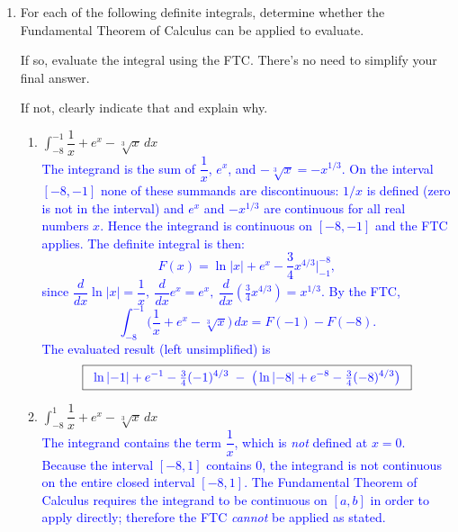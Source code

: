 \documentclass[11pt]{article}
\begin{document}
\begin{enumerate}

\newpage

%
\item For each of the following definite integrals, determine whether the Fundamental Theorem of Calculus can be applied to evaluate. 

If so, evaluate the integral using the FTC. There's no need to simplify your final answer.

If not, clearly indicate that and explain why.

\begin{enumerate}
    \item $\displaystyle\int_{-8}^{-1}\dfrac{1}{x}+e^x-\sqrt[3]{x}\, dx$\\
\textcolor{blue}{
The integrand is the sum of $\dfrac{1}{x}$, $e^x$, and $-\sqrt[3]{x}=-x^{1/3}$.  On the interval $[-8,-1]$ none of these summands are discontinuous: $1/x$ is defined (zero is not in the interval) and $e^x$ and $-x^{1/3}$ are continuous for all real numbers $x$.  Hence the integrand is continuous on $[-8,-1]$ and the FTC applies.
    The definite integral is then:\\
    \[
    F(x)=\ln|x|+e^x-\frac{3}{4}x^{4/3}\bigg|_{-1}^{-8},
    \]
    since \(\dfrac{d}{dx}\ln|x|=\dfrac{1}{x},\ \dfrac{d}{dx}e^x=e^x,\ \dfrac{d}{dx}\!\left(\frac{3}{4}x^{4/3}\right)=x^{1/3}.\)
    By the FTC,
    \[
    \int_{-8}^{-1}\!\Big(\dfrac{1}{x}+e^x-\sqrt[3]{x}\Big)\,dx
    =F(-1)-F(-8).
    \]
    The evaluated result (left unsimplified) is
    \[
    \boxed{\;\textcolor{blue}{\; \ln|{-1}|+e^{-1}-\tfrac{3}{4}(-1)^{4/3}
    \;-\;\big(\ln|{-8}|+e^{-8}-\tfrac{3}{4}(-8)^{4/3}\big)\;}\;}
    \]
}


    \item $\displaystyle\int_{-8}^1\dfrac{1}{x}+e^x-\sqrt[3]{x}\, dx$\\
    \textcolor{blue}{
     The integrand contains the term $\dfrac{1}{x}$, which is \emph{not} defined at $x=0$.  Because the interval $[-8,1]$ contains $0$, the integrand is not continuous on the entire closed interval $[-8,1]$.  The Fundamental Theorem of Calculus requires the integrand to be continuous on $[a,b]$ in order to apply directly; therefore the FTC \emph{cannot} be applied as stated.\\
    }
\end{enumerate}


\end{enumerate}
\end{document}
